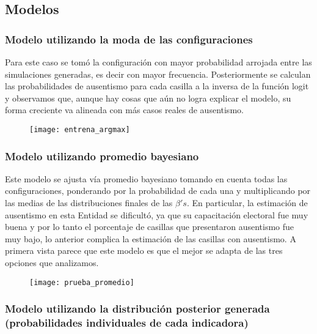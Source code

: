 \documentclass[DIV=calc, 
					paper=letter, 
					fontsize=11pt, 
					twocolumn]{scrartcl}
\begin{document}
\subsection{Modelos}
\vspace{3mm}

\subsubsection{Modelo utilizando la moda de las configuraciones}
\vspace{3mm}

Para este caso se tom\'o la configuraci\'on con mayor probabilidad arrojada entre las simulaciones generadas, es decir con mayor frecuencia. Posteriormente se calculan las probabilidades de ausentismo para cada casilla a la inversa de la funci\'on logit y observamos que, aunque hay cosas que a\'un no logra explicar el modelo, su forma creciente va alineada con m\'as casos reales de ausentismo.

\begin{figure}[H]
\caption{}
\centering
\texttt{[image: entrena\_argmax]}
\label{fig:CoL}
\end{figure}

\subsubsection{Modelo utilizando promedio bayesiano}
\vspace{3mm}

Este modelo se ajusta v\'ia promedio bayesiano tomando en cuenta todas las configuraciones, ponderando por la probabilidad de cada una y multiplicando por las medias de las distribuciones finales de las $\beta{'s}$. En particular, la estimaci\'on de ausentismo en esta Entidad se dificult\'o, ya que su capacitaci\'on electoral fue muy buena y por lo tanto el porcentaje de casillas que presentaron ausentismo fue muy bajo, lo anterior complica la estimaci\'on de las casillas con ausentismo. A primera vista parece que este modelo es que el mejor se adapta de las tres opciones que analizamos.\\


\begin{figure}[H]
\caption{}
\centering
\texttt{[image: prueba\_promedio]}
\label{fig:AL}
\end{figure}

\subsubsection{Modelo utilizando la distribuci\'on posterior generada (probabilidades individuales de cada indicadora)}
\vspace{3mm}
\end{document}

